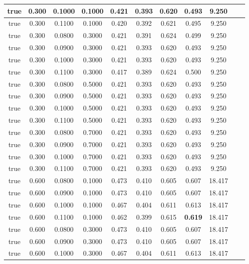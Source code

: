 \documentclass{article}
\begin{document}
\begin{longtable}[c]{|c|c|c|c|c|c|c|c|c|c|c|}
 true & 0.300 & 0.1000 & 0.1000 & 0.421 & 0.393 & 0.620 & 0.493 & 9.250  \\ \hline 
 true & 0.300 & 0.1100 & 0.1000 & 0.420 & 0.392 & 0.621 & 0.495 & 9.250  \\ \hline 
 true & 0.300 & 0.0800 & 0.3000 & 0.421 & 0.391 & 0.624 & 0.499 & 9.250  \\ \hline 
 true & 0.300 & 0.0900 & 0.3000 & 0.421 & 0.393 & 0.620 & 0.493 & 9.250  \\ \hline 
 true & 0.300 & 0.1000 & 0.3000 & 0.421 & 0.393 & 0.620 & 0.493 & 9.250  \\ \hline 
 true & 0.300 & 0.1100 & 0.3000 & 0.417 & 0.389 & 0.624 & 0.500 & 9.250  \\ \hline 
 true & 0.300 & 0.0800 & 0.5000 & 0.421 & 0.393 & 0.620 & 0.493 & 9.250  \\ \hline 
 true & 0.300 & 0.0900 & 0.5000 & 0.421 & 0.393 & 0.620 & 0.493 & 9.250  \\ \hline 
 true & 0.300 & 0.1000 & 0.5000 & 0.421 & 0.393 & 0.620 & 0.493 & 9.250  \\ \hline 
 true & 0.300 & 0.1100 & 0.5000 & 0.421 & 0.393 & 0.620 & 0.493 & 9.250  \\ \hline 
 true & 0.300 & 0.0800 & 0.7000 & 0.421 & 0.393 & 0.620 & 0.493 & 9.250  \\ \hline 
 true & 0.300 & 0.0900 & 0.7000 & 0.421 & 0.393 & 0.620 & 0.493 & 9.250  \\ \hline 
 true & 0.300 & 0.1000 & 0.7000 & 0.421 & 0.393 & 0.620 & 0.493 & 9.250  \\ \hline 
 true & 0.300 & 0.1100 & 0.7000 & 0.421 & 0.393 & 0.620 & 0.493 & 9.250  \\ \hline 
 true & 0.600 & 0.0800 & 0.1000 & 0.473 & 0.410 & 0.605 & 0.607 & 18.417  \\ \hline 
 true & 0.600 & 0.0900 & 0.1000 & 0.473 & 0.410 & 0.605 & 0.607 & 18.417  \\ \hline 
 true & 0.600 & 0.1000 & 0.1000 & 0.467 & 0.404 & 0.611 & 0.613 & 18.417  \\ \hline 
 true & 0.600 & 0.1100 & 0.1000 & 0.462 & 0.399 & 0.615 & \cellcolor{gray!20} \textbf{0.619} & 18.417  \\ \hline 
 true & 0.600 & 0.0800 & 0.3000 & 0.473 & 0.410 & 0.605 & 0.607 & 18.417  \\ \hline 
 true & 0.600 & 0.0900 & 0.3000 & 0.473 & 0.410 & 0.605 & 0.607 & 18.417  \\ \hline 
 true & 0.600 & 0.1000 & 0.3000 & 0.467 & 0.404 & 0.611 & 0.613 & 18.417  \\ \hline 

\end{longtable}
\end{document}
